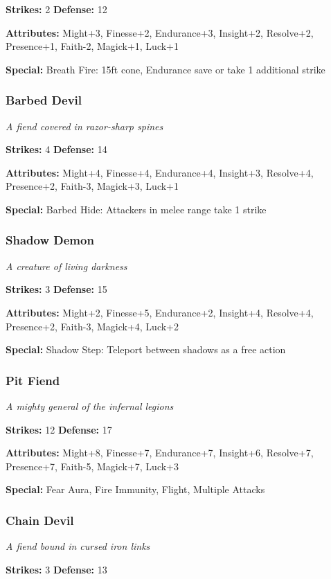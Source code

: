\documentclass[10pt,twoside]{article}
\begin{document}
\textbf{Strikes:} 2 \quad \textbf{Defense:} 12

\textbf{Attributes:} Might+3, Finesse+2, Endurance+3, Insight+2, Resolve+2, Presence+1, Faith-2, Magick+1, Luck+1

\textbf{Special:} Breath Fire: 15ft cone, Endurance save or take 1 additional strike

\subsubsection{Barbed Devil}
\textit{A fiend covered in razor-sharp spines}

\textbf{Strikes:} 4 \quad \textbf{Defense:} 14

\textbf{Attributes:} Might+4, Finesse+4, Endurance+4, Insight+3, Resolve+4, Presence+2, Faith-3, Magick+3, Luck+1

\textbf{Special:} Barbed Hide: Attackers in melee range take 1 strike

\subsubsection{Shadow Demon}
\textit{A creature of living darkness}

\textbf{Strikes:} 3 \quad \textbf{Defense:} 15

\textbf{Attributes:} Might+2, Finesse+5, Endurance+2, Insight+4, Resolve+4, Presence+2, Faith-3, Magick+4, Luck+2

\textbf{Special:} Shadow Step: Teleport between shadows as a free action

\subsubsection{Pit Fiend}
\textit{A mighty general of the infernal legions}

\textbf{Strikes:} 12 \quad \textbf{Defense:} 17

\textbf{Attributes:} Might+8, Finesse+7, Endurance+7, Insight+6, Resolve+7, Presence+7, Faith-5, Magick+7, Luck+3

\textbf{Special:} Fear Aura, Fire Immunity, Flight, Multiple Attacks

\subsubsection{Chain Devil}
\textit{A fiend bound in cursed iron links}

\textbf{Strikes:} 3 \quad \textbf{Defense:} 13
\end{document}
